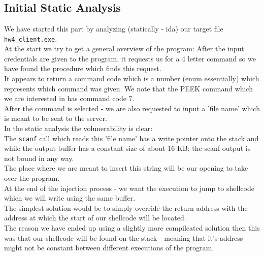 \documentclass{article}
\begin{document}
\section{}
\subsection{Initial Static Analysis}
We have started this part by analyzing (statically - ida) our target file \texttt{hw4\_client.exe}.\\
At the start we try to get a general overview of the program:
After the input credentials are given to the program,
it requests us for a 4 letter command so
we have found the procedure which finds this request.\\
It appears to return a command code which is a number (enum essentially)
which represents which command was given. We note that the
PEEK command which we are interested in has command code 7.\\
After the command is selected - we are also requested
to input a 'file name' which is meant to be sent to the server.\\
In the static analysis the volunerability is clear:\\
The \texttt{scanf} call which reads this 'file name'
has a write pointer onto the stack and while the output buffer
has a constant size of about 16 KB; the scanf output
is not bound in any way.\\
The place where we are meant to insert this string will be our opening to take
over the program.\\

At the end of the injection process - we want
the execution to jump to shellcode which we will write using the same buffer.\\
The simplest solution would be to simply override the return address
with the address at which the start of our shellcode will be located.\\
The reason we have ended up using a slightly more compilcated solution then
this was that our shellcode will be found on the stack - meaning that
it's address might not be constant between different executions of the program.\\
\end{document}
